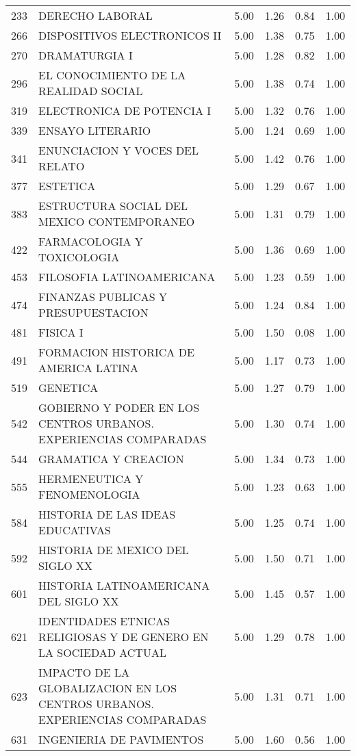 \begin{table}[ht]
\begin{tabular}{rlrrrr}
  233 & DERECHO LABORAL & 5.00 & 1.26 & 0.84 & 1.00 \\ 
  266 & DISPOSITIVOS ELECTRONICOS II & 5.00 & 1.38 & 0.75 & 1.00 \\ 
  270 & DRAMATURGIA I & 5.00 & 1.28 & 0.82 & 1.00 \\ 
  296 & EL CONOCIMIENTO DE LA REALIDAD SOCIAL & 5.00 & 1.38 & 0.74 & 1.00 \\ 
  319 & ELECTRONICA DE POTENCIA I & 5.00 & 1.32 & 0.76 & 1.00 \\ 
  339 & ENSAYO LITERARIO & 5.00 & 1.24 & 0.69 & 1.00 \\ 
  341 & ENUNCIACION Y VOCES DEL RELATO & 5.00 & 1.42 & 0.76 & 1.00 \\ 
  377 & ESTETICA & 5.00 & 1.29 & 0.67 & 1.00 \\ 
  383 & ESTRUCTURA SOCIAL DEL MEXICO CONTEMPORANEO & 5.00 & 1.31 & 0.79 & 1.00 \\ 
  422 & FARMACOLOGIA Y TOXICOLOGIA & 5.00 & 1.36 & 0.69 & 1.00 \\ 
  453 & FILOSOFIA LATINOAMERICANA & 5.00 & 1.23 & 0.59 & 1.00 \\ 
  474 & FINANZAS PUBLICAS Y PRESUPUESTACION & 5.00 & 1.24 & 0.84 & 1.00 \\ 
  481 & FISICA I & 5.00 & 1.50 & 0.08 & 1.00 \\ 
  491 & FORMACION HISTORICA DE AMERICA LATINA & 5.00 & 1.17 & 0.73 & 1.00 \\ 
  519 & GENETICA & 5.00 & 1.27 & 0.79 & 1.00 \\ 
  542 & GOBIERNO Y PODER EN LOS CENTROS URBANOS. EXPERIENCIAS COMPARADAS & 5.00 & 1.30 & 0.74 & 1.00 \\ 
  544 & GRAMATICA Y CREACION & 5.00 & 1.34 & 0.73 & 1.00 \\ 
  555 & HERMENEUTICA Y FENOMENOLOGIA & 5.00 & 1.23 & 0.63 & 1.00 \\ 
  584 & HISTORIA DE LAS IDEAS EDUCATIVAS & 5.00 & 1.25 & 0.74 & 1.00 \\ 
  592 & HISTORIA DE MEXICO DEL SIGLO XX & 5.00 & 1.50 & 0.71 & 1.00 \\ 
  601 & HISTORIA LATINOAMERICANA DEL SIGLO XX & 5.00 & 1.45 & 0.57 & 1.00 \\ 
  621 & IDENTIDADES ETNICAS RELIGIOSAS Y DE GENERO EN LA SOCIEDAD ACTUAL & 5.00 & 1.29 & 0.78 & 1.00 \\ 
  623 & IMPACTO DE LA GLOBALIZACION EN LOS CENTROS URBANOS. EXPERIENCIAS COMPARADAS & 5.00 & 1.31 & 0.71 & 1.00 \\ 
  631 & INGENIERIA DE PAVIMENTOS & 5.00 & 1.60 & 0.56 & 1.00 \\ 

\end{tabular}
\end{table}
